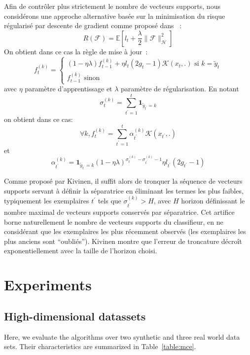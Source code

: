 \documentclass[twocolumn]{article}
\begin{document}
Afin de contrôler plus strictement le nombre de vecteurs supports, nous considérons une approche alternative basée sur la minimisation du risque régularisé par descente de gradient comme proposé dans \cite{XXXKivinen}~:
$$R(\mathcal{F}) = \mathbb{E}\left[ l_t + \frac{\lambda}{2}\|\mathcal{F}\|^2_\mathcal{H}\right]$$
On obtient dans ce cas la règle de mise à jour~:
$$f_t^{(k)}=\left\{
\begin{array}{l}
(1-\eta\lambda) f_{t-1}^{(k)} + \eta l_t (2g_t-1) \mathcal{K}(x_t,.) \text{ si } k=\tilde{y}_t\\
 f_{t-1}^{(k)} \text{ sinon}
\end{array}
\right.
$$
avec $\eta$ paramètre d'apprentissage et $\lambda$ paramètre de régularisation. En notant 
$$\sigma_t^{(k)} = \sum_{t^\prime=1}^t
\mathbf{1}_{\tilde{y}_{t^\prime}=k}$$
on obtient dans ce cas:
$$\forall k, f^{(k)}_t = \sum_{t^\prime = 1} ^t \alpha_{t^\prime}^{(k)} \mathcal{K}(x_{t^\prime},.)$$
et
$$\alpha_{t^\prime}^{(k)} = \mathbf{1}_{\tilde{y}_{t^\prime}=k}(1 - \eta \lambda)^{\sigma_t^{(k)} - \sigma_{t^\prime}^{(k)}-1}  \eta l_{t^\prime} (2g_{t^\prime}-1)$$

Comme proposé par Kivinen, il suffit alors de tronquer la séquence de vecteurs supports servant à définir la séparatrice en éliminant les termes les plus faibles, typiquement les exemplaires $t^\prime$ tels que $\sigma_{t^\prime}^{(k)} > H$, avec $H$ horizon définissant le nombre maximal de vecteurs supports conservés par séparatrice. Cet artifice borne naturellement le nombre de vecteurs supports du classifieur, en ne considérant que les exemplaires les plus récemment observés (les exemplaires les plus anciens sont ``oubliés'').  Kivinen montre que l'erreur de troncature décroît exponentiellement avec la taille de l'horizon choisi. 


  


\section{Experiments}

\subsection{High-dimensional datassets}
\label{subsec:BPAE}
Here, we evaluate the algorithms over two synthetic and three real world data sets. Their characteristics are summarized in Table~\ref{table:mce}.
\end{document}
